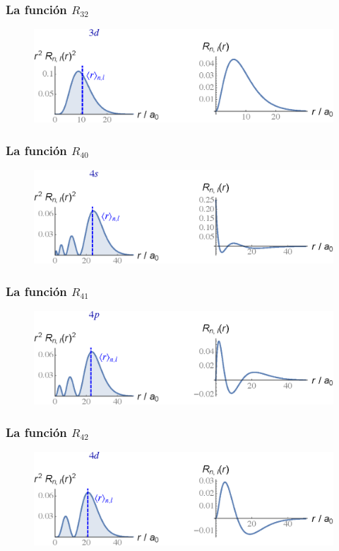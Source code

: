 \documentclass[12pt]{beamer}
\begin{document}
\begin{frame}
\frametitle{La función $R_{32}$}
\begin{figure}
   \centering
   \includegraphics[scale=0.67]{Imagenes/Plot_Funcion_Radial_32.eps}
\end{figure}
\end{frame}
\begin{frame}
\frametitle{La función $R_{40}$}
\begin{figure}
   \centering
   \includegraphics[scale=0.67]{Imagenes/Plot_Funcion_Radial_40.eps}
\end{figure}
\end{frame}
\begin{frame}
\frametitle{La función $R_{41}$}
\begin{figure}
   \centering
   \includegraphics[scale=0.67]{Imagenes/Plot_Funcion_Radial_41.eps}
\end{figure}
\end{frame}
\begin{frame}
\frametitle{La función $R_{42}$}
\begin{figure}
   \centering
   \includegraphics[scale=0.67]{Imagenes/Plot_Funcion_Radial_42.eps}
\end{figure}
\end{frame}
\end{document}
